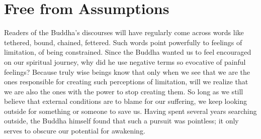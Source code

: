 

\chapter{Free from Assumptions}


Readers of the Buddha’s discourses will have regularly come across words
like tethered, bound, chained,
fettered.\cite{dhp-276}
Such words point powerfully to feelings of limitation, of being constrained. Since the
Buddha wanted us to feel encouraged on our spiritual journey, why did he
use negative terms so evocative of painful feelings? Because truly wise
beings know that only when we see that we are the ones responsible for
creating such perceptions of limitation, will we realize that we are
also the ones with the power to stop creating them. So long as we still
believe that external conditions are to blame for our suffering, we keep
looking outside for something or someone to save us. Having spent
several years searching outside, the Buddha himself found that such a
pursuit was pointless; it only serves to obscure our potential for
awakening.

